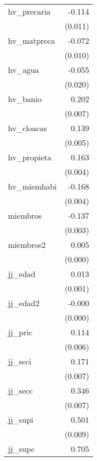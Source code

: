 {\begin{longtable}{l*{1}{D{.}{.}{-1}}}
\addlinespace
hv\_precaria &      -0.114\sym{***}\\
            &     (0.011)         \\
\addlinespace
hv\_matpreca &      -0.072\sym{***}\\
            &     (0.010)         \\
\addlinespace
hv\_agua     &      -0.055\sym{**} \\
            &     (0.020)         \\
\addlinespace
hv\_banio    &       0.202\sym{***}\\
            &     (0.007)         \\
\addlinespace
hv\_cloacas  &       0.139\sym{***}\\
            &     (0.005)         \\
\addlinespace
hv\_propieta &       0.163\sym{***}\\
            &     (0.004)         \\
\addlinespace
hv\_miemhabi &      -0.168\sym{***}\\
            &     (0.004)         \\
\addlinespace
miembros    &      -0.137\sym{***}\\
            &     (0.003)         \\
\addlinespace
miembros2   &       0.005\sym{***}\\
            &     (0.000)         \\
\addlinespace
jj\_edad     &       0.013\sym{***}\\
            &     (0.001)         \\
\addlinespace
jj\_edad2    &      -0.000\sym{***}\\
            &     (0.000)         \\
\addlinespace
jj\_pric     &       0.114\sym{***}\\
            &     (0.006)         \\
\addlinespace
jj\_seci     &       0.171\sym{***}\\
            &     (0.007)         \\
\addlinespace
jj\_secc     &       0.346\sym{***}\\
            &     (0.007)         \\
\addlinespace
jj\_supi     &       0.501\sym{***}\\
            &     (0.009)         \\
\addlinespace
jj\_supc     &       0.705\sym{***}\\

\end{longtable}}
